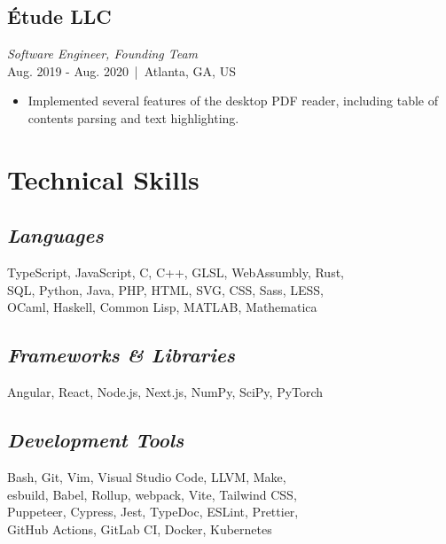 \documentclass[11pt]{article}
\begin{document}
\begin{minipage}{280pt}
\subsection*{Étude LLC}
\textit{Software Engineer, Founding Team}\\
Aug. 2019 - Aug. 2020 \,|\,  Atlanta, GA, US\\
\begin{itemize}
\item Implemented several features of the desktop PDF reader, including table of contents parsing and text highlighting.
\end{itemize}

\section*{\sc Technical Skills}
\subsection*{\it Languages}
TypeScript, JavaScript, C, C++, GLSL, WebAssumbly, Rust,\\
SQL, Python, Java, PHP, HTML, SVG, CSS, Sass, LESS,\\
OCaml, Haskell, Common Lisp, MATLAB, Mathematica

\subsection*{\it Frameworks \& Libraries}
Angular, React, Node.js, Next.js, NumPy, SciPy, PyTorch

\subsection*{\it Development Tools}
Bash, Git, Vim, Visual Studio Code, LLVM, Make,\\
esbuild, Babel, Rollup, webpack, Vite, Tailwind CSS,\\
Puppeteer, Cypress, Jest, TypeDoc, ESLint, Prettier, \\
GitHub Actions, GitLab CI, Docker, Kubernetes

\end{minipage}
\end{document}
